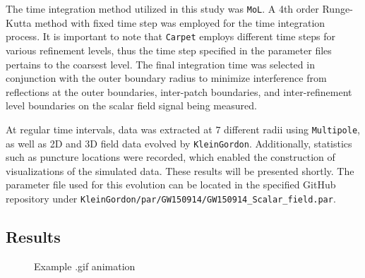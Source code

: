 The time integration method utilized in this study was \texttt{MoL}. A 4th order Runge-Kutta method with fixed time step was employed for the time integration process. It is important to note that \texttt{Carpet} employs different time steps for various refinement levels, thus the time step specified in the parameter files pertains to the coarsest level. The final integration time was selected in conjunction with the outer boundary radius to minimize interference from reflections at the outer boundaries, inter-patch boundaries, and inter-refinement level boundaries on the scalar field signal being measured.

At regular time intervals, data was extracted at $7$ different radii using \texttt{Multipole}, as well as 2D and 3D field data evolved by \texttt{KleinGordon}. Additionally, statistics such as puncture locations were recorded, which enabled the construction of visualizations of the simulated data. These results will be presented shortly. The parameter file used for this evolution can be located in the specified GitHub repository under \texttt{KleinGordon/par/GW150914/GW150914\_Scalar\_field.par}.

\subsection{Results}

\begin{figure}
  \centering
  \caption{Example .gif animation}
\end{figure}

